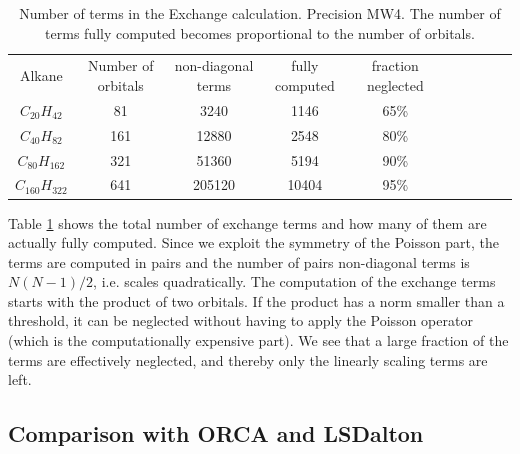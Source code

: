 \documentclass[%
 aip,
 amsmath,amssymb,
 reprint,%
]{revtex4-1}
\begin{document}
\begin{table}[t]
    \centering
    \begin{tabular}{cccccccccc}
Alkane & Number of orbitals& non-diagonal terms&  fully computed & fraction neglected \\
$C_{20}H_{42}$ &81 & 3240 & 1146 & 65\% \\ 
$C_{40}H_{82}$ &161 & 12880 & 2548 & 80\% \\ 
$C_{80}H_{162}$ &321 &  51360& 5194& 90\% \\ 
$C_{160}H_{322}$ & 641& 205120 & 10404& 95\% \\ 
    \end{tabular}
    \caption{Number of terms in the Exchange calculation. Precision MW4. The number of terms fully computed becomes proportional to the number of orbitals. } 
    \label{tab:adapEx}
\end{table}

 
Table \ref{tab:adapEx} shows the total number of exchange terms and how many of them are actually fully computed. Since we exploit the symmetry of the Poisson part, the terms are computed in pairs and the number of pairs non-diagonal terms is $N(N-1)/2$, i.e. scales quadratically.    
The computation of the exchange terms starts with the product of two orbitals. If the product has a norm smaller than a threshold, it can be neglected without having to apply the Poisson operator (which is the computationally expensive part). We see that a large fraction of the terms are effectively neglected, and thereby only the linearly scaling terms are left.



\subsection{Comparison with ORCA  and LSDalton  }
\end{document}
